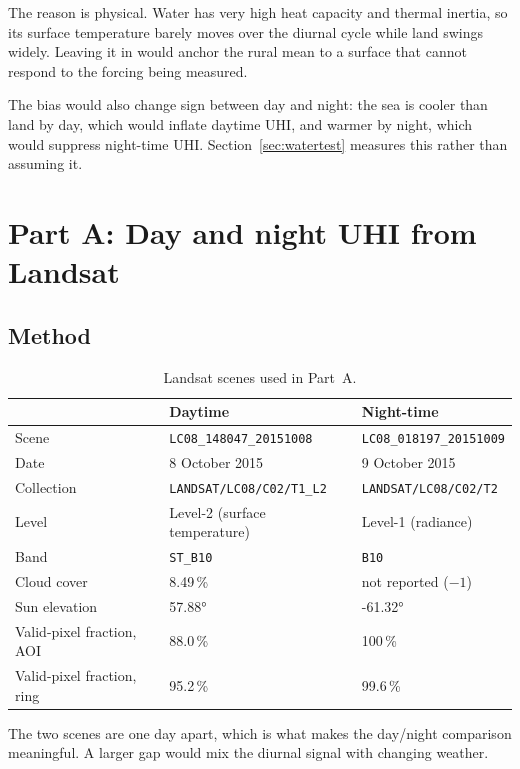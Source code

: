\documentclass[11pt,a4paper]{article}
\begin{document}
The reason is physical. Water has very high heat capacity and thermal
inertia, so its surface temperature barely moves over the diurnal
cycle while land swings widely. Leaving it in would anchor the rural
mean to a surface that cannot respond to the forcing being measured.

The bias would also change sign between day and night: the sea is
cooler than land by day, which would inflate daytime UHI, and warmer
by night, which would suppress night-time UHI. Section~\ref{sec:watertest}
measures this rather than assuming it.

\section{Part A: Day and night UHI from Landsat}
\label{sec:partA}

\subsection{Method}

\begin{table}[htbp]
\centering
\small
\begin{tabular}{lll}
\toprule
 & \textbf{Daytime} & \textbf{Night-time} \\
\midrule
Scene   & \texttt{LC08\_148047\_20151008}
        & \texttt{LC08\_018197\_20151009} \\
Date    & 8 October 2015 & 9 October 2015 \\
Collection & \texttt{LANDSAT/LC08/C02/T1\_L2}
           & \texttt{LANDSAT/LC08/C02/T2} \\
Level   & Level-2 (surface temperature) & Level-1 (radiance) \\
Band    & \texttt{ST\_B10} & \texttt{B10} \\
Cloud cover & 8.49\,\% & not reported ($-1$) \\
Sun elevation & \ang{57.88} & \ang{-61.32} \\
Valid-pixel fraction, AOI & 88.0\,\% & 100\,\% \\
Valid-pixel fraction, ring & 95.2\,\% & 99.6\,\% \\
\bottomrule
\end{tabular}
\caption{Landsat scenes used in Part~A.}
\label{tab:scenes}
\end{table}

The two scenes are one day apart, which is what makes the day/night
comparison meaningful. A larger gap would mix the diurnal signal
with changing weather.
\end{document}
